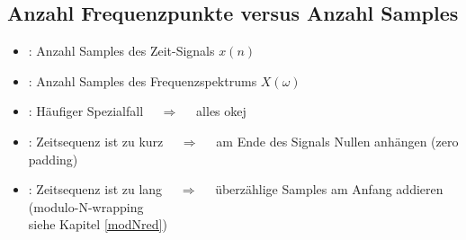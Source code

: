 	\subsection{Anzahl Frequenzpunkte versus Anzahl Samples}
		\begin{itemize}
		 \item {}: Anzahl Samples des Zeit-Signals $x(n)$
		 \item {}: Anzahl Samples des Frequenzspektrums $X(\omega)$
		 \item {}: Häufiger Spezialfall $\quad\Rightarrow\quad$ alles okej
		 \item {}: Zeitsequenz ist zu kurz $\quad\Rightarrow\quad$ am Ende des Signals Nullen anhängen (zero padding)
		 \item {}: Zeitsequenz ist zu lang $\quad\Rightarrow\quad$ überzählige Samples am Anfang addieren (modulo-N-wrapping\\ \hspace*{14cm}siehe Kapitel \ref{modNred})\\[-0.8cm]
		 \end{itemize}

